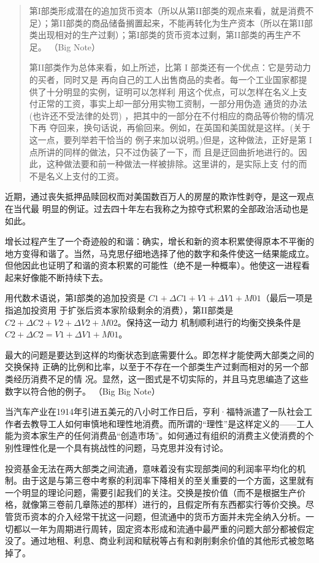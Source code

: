 \begin{quotation}
第I部类形成潜在的追加货币资本（所以从第II部类的观点来看，就是消费不足）；第II部类的商品储备搁置起来，不能再转化为生产资本（所以在第II部类出现相对的生产过剩）；第I部类的货币资本过剩，第II部类的再生产不足。 （Big Note）

第II部类作为总体来看，如上所述，比第 I 部类还有一个优点：它是劳动力的买者，同时又是
再向自己的工人出售商品的卖者。每一个工业国家都提供了十分明显的实例，证明可以怎样利
用这个优点，可以怎样在名义上支付正常的工资，事实上却一部分用实物工资制，一部分用伪造
通货的办法(也许还不受法律的处罚) ，把其中的一部分在不付相应的商品等价物的情况下再
夺回来，换句话说，再偷回来。例如，在英国和美国就是这样。(关于这一点，要列举若干恰当的
例子来加以说明。)但是，这种做法，正好是第 I点所讲的同样的做法，只不过伪装了一下，而
且是迂回曲折地进行的。因此，这种做法要和前一种做法一样被排除。这里讲的，是实际上支
付的而不是名义上支付的工资。 


\end{quotation}


近期，通过丧失抵押品赎回权而对美国数百万人的房屋的欺诈性剥夺，是这一观点在当代最
明显的例证。过去四十年左右我称之为掠夺式积累的全部政治活动也是如此。

增长过程产生了一个奇迹般的和谐：确实，增长和新的资本积累使得原本不平衡的地方变得和谐了。当然，马克思仔细地选择了他的数字和条件使这一结果能成立。但他因此也证明了和谐的资本积累的可能性（绝不是一种概率）。他使这一进程看起来好像能不断持续下去。

用代数术语说，第I部类的追加投资是 $C1+ \Delta C1+V1+ \Delta V1+M01$（最后一项是指追加投资用
于扩张后资本家阶级剩余的消费），第II部类是 $C2+ \Delta C2+V2+ \Delta V2+M02$。保持这一动力
机制顺利进行的均衡交换条件是 $C2+ \Delta C2=V1+ \Delta V1+M01$。

最大的问题是要达到这样的均衡状态到底需要什么。即怎样才能使两大部类之间的交换保持
正确的比例和比率，以至于不存在一个部类生产过剩而相对的另一个部类经历消费不足的情
况。显然，这一图式是不切实际的，并且马克思编造了这些数字以符合他的例子。 （Big Big Note）

当汽车产业在1914年引进五美元的八小时工作日后，亨利·福特派遣了一队社会工作者去教导工人如何审慎地和理性地消费。而所谓的“理性”是这样定义的——工人能为资本家生产的任何消费品“创造市场”。如何通过有组织的消费主义使消费的个别性理性化是一个具有挑战性的问题，马克思并没有讨论。


投资基金无法在两大部类之间流通，意味着没有实现部类间的利润率平均化的机制。由于这是与第三卷中考察的利润率下降相关的至关重要的一个方面，这里就有一个明显的理论问题，需要引起我们的关注。交换是按价值（而不是根据生产价格，就像第三卷前几章陈述的那样）进行的，且假定所有东西都实行等价交换。尽管货币资本的介入经常干扰这一问题，但流通中的货币方面并未完全纳入分析。一切都以一年为周期进行周转，固定资本形成和流通中最严重的问题大部分都被假定没了。通过地租、利息、商业利润和赋税等占有和剥削剩余价值的其他形式被忽略掉了。

